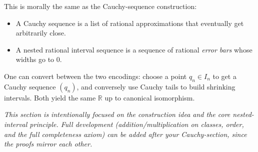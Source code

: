 \begin{remark*}
This is morally the same as the Cauchy-sequence construction:
\begin{itemize}
  \item A Cauchy sequence is a list of rational approximations that eventually
        get arbitrarily close.
  \item A nested rational interval sequence is a sequence of rational
        \emph{error bars} whose widths go to $0$.
\end{itemize}
One can convert between the two encodings:
choose a point $q_n\in I_n$ to get a Cauchy sequence $(q_n)$, and conversely
use Cauchy tails to build shrinking intervals.
Both yield the same $\mathbb{R}$ up to canonical isomorphism.
\end{remark*}

\begin{remark*}[Status]
\textit{This section is intentionally focused on the construction idea and the
core nested-interval principle. Full development (addition/multiplication on
classes, order, and the full completeness axiom) can be added after your
Cauchy-section, since the proofs mirror each other.}
\end{remark*}
